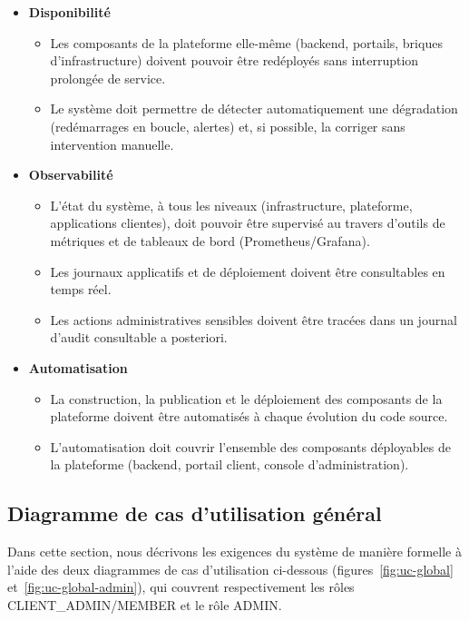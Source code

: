 \begin{itemize}
    \item \textbf{Disponibilité}
    \begin{itemize}[label=--]
        \item Les composants de la plateforme elle-même (backend, portails, briques d'infrastructure) doivent pouvoir être redéployés sans interruption prolongée de service.
        \item Le système doit permettre de détecter automatiquement une dégradation (redémarrages en boucle, alertes) et, si possible, la corriger sans intervention manuelle.
    \end{itemize}

    \item \textbf{Observabilité}
    \begin{itemize}[label=--]
        \item L'état du système, à tous les niveaux (infrastructure, plateforme, applications clientes), doit pouvoir être supervisé au travers d'outils de métriques et de tableaux de bord (Prometheus/Grafana).
        \item Les journaux applicatifs et de déploiement doivent être consultables en temps réel.
        \item Les actions administratives sensibles doivent être tracées dans un journal d'audit consultable a posteriori.
    \end{itemize}

    \item \textbf{Automatisation}
    \begin{itemize}[label=--]
        \item La construction, la publication et le déploiement des composants de la plateforme doivent être automatisés à chaque évolution du code source.
        \item L'automatisation doit couvrir l'ensemble des composants déployables de la plateforme (backend, portail client, console d'administration).
    \end{itemize}
\end{itemize}

\subsection{Diagramme de cas d'utilisation général}
Dans cette section, nous décrivons les exigences du système de manière formelle à l'aide des deux diagrammes de cas d'utilisation ci-dessous (figures~\ref{fig:uc-global} et~\ref{fig:uc-global-admin}), qui couvrent respectivement les rôles CLIENT\_ADMIN/MEMBER et le rôle ADMIN.

